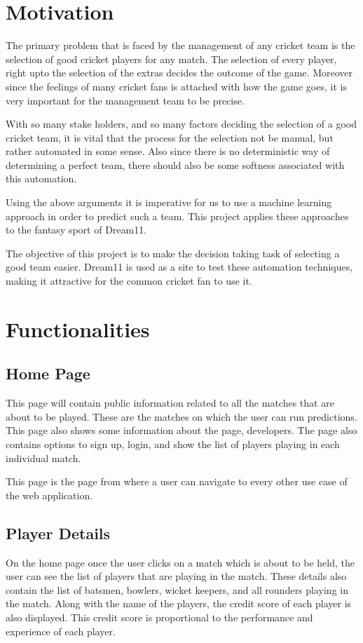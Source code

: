 \documentclass[12pt]{article}
\begin{document}
\section{Motivation}
The primary problem that is faced by the management of any cricket team is the selection of good cricket players for any match. The selection of every player, right upto the selection of the extras decides the outcome of the game. Moreover since the feelings of many cricket fans is attached with how the game goes, it is very important for the management team to be precise.\par
With so many stake holders, and so many factors deciding the selection of a good cricket team, it is vital that the process for the selection not be manual, but rather automated in some sense. Also since there is no deterministic way of determining a perfect team, there should also be some softness associated with this automation.\par
Using the above arguments it is imperative for us to use a machine learning approach in order to predict such a team. This project applies these approaches to the fantasy sport of Dream11.\par
The objective of this project is to make the decision taking task of selecting a good team easier. Dream11 is used as a site to test these automation techniques, making it attractive for the common cricket fan to use it.\par

\newpage
\section{Functionalities}
\subsection{Home Page}
This page will contain public information related to all the matches that are about to be played. These are the matches on which the user can run predictions. This page also shows some information about the page, developers. The page also contains options to sign up, login, and show the list of players playing in each individual match.\par
This page is the page from where a user can navigate to every other use case of the web application.\par
\subsection{Player Details}
On the home page once the user clicks on a match which is about to be held, the user can see the list of players that are playing in the match. These details also contain the list of batsmen, bowlers, wicket keepers, and all rounders playing in the match. Along with the name of the players, the credit score of each player is also displayed. This credit score is proportional to the performance and experience of each player.
\end{document}
